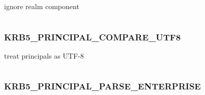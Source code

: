 \documentclass[letterpaper,10pt,english]{sphinxmanual}
\begin{document}
ignore realm component

\begin{tabulary}{\linewidth}{|L|L|}
\hline

 & 
\\
\hline\end{tabulary}



\subsubsection{KRB5\_PRINCIPAL\_COMPARE\_UTF8}
\label{appdev/refs/macros/KRB5_PRINCIPAL_COMPARE_UTF8:krb5-principal-compare-utf8-data}\label{appdev/refs/macros/KRB5_PRINCIPAL_COMPARE_UTF8::doc}\label{appdev/refs/macros/KRB5_PRINCIPAL_COMPARE_UTF8:krb5-principal-compare-utf8}

\begin{fulllineitems}
\label{appdev/refs/macros/KRB5_PRINCIPAL_COMPARE_UTF8:KRB5_PRINCIPAL_COMPARE_UTF8}
\end{fulllineitems}


treat principals as UTF-8

\begin{tabulary}{\linewidth}{|L|L|}
\hline

 & 
\\
\hline\end{tabulary}



\subsubsection{KRB5\_PRINCIPAL\_PARSE\_ENTERPRISE}
\label{appdev/refs/macros/KRB5_PRINCIPAL_PARSE_ENTERPRISE:krb5-principal-parse-enterprise-data}\label{appdev/refs/macros/KRB5_PRINCIPAL_PARSE_ENTERPRISE::doc}\label{appdev/refs/macros/KRB5_PRINCIPAL_PARSE_ENTERPRISE:krb5-principal-parse-enterprise}

\begin{fulllineitems}
\label{appdev/refs/macros/KRB5_PRINCIPAL_PARSE_ENTERPRISE:KRB5_PRINCIPAL_PARSE_ENTERPRISE}
\end{fulllineitems}
\end{document}
